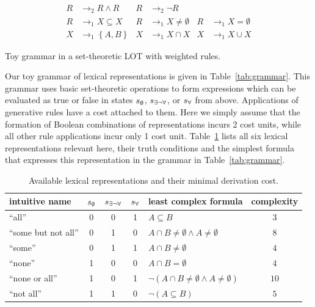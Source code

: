 \documentclass[a4paper, 11pt]{article}
\theoremstyle{Satz}
\newcommand{\set}[1]{\left\{#1\right\}}
\newcommand{\state}{\ensuremath{s}\xspace}		%
\newcommand{\mystate}[1]{\ensuremath{\state_{\text{#1}}}\xspace} %
\newcommand{\ssome}{\mystate{\ensuremath{\exists\neg\forall}}}
\newcommand{\sall}{\mystate{\ensuremath{\forall}}}
\newcommand{\snone}{\mystate{\ensuremath{\emptyset}}}
\begin{document}
\begin{table}
  \centering
  \begin{align*}
    R & \rightarrow_2 R \wedge R 
    & R & \rightarrow_2 \neg R  \\ 
    R & \rightarrow_1 X \subseteq X &
    R & \rightarrow_1 X \neq \emptyset &
    R & \rightarrow_1 X = \emptyset  \\
    X & \rightarrow_1 \set{A,B} & 
    X & \rightarrow_1 X \cap X & 
    X & \rightarrow_1 X \cup X    
  \end{align*}
  \caption{Toy grammar in a set-theoretic LOT with weighted rules.}
  \label{tab:grammar}
\end{table}

Our toy grammar of lexical representations is given in Table~\ref{tab:grammar}. This grammar uses basic
set-theoretic operations to form expressions which can be evaluated as true or false in states
$\snone$, $\ssome$, or $\sall$ from above. Applications of generative rules have a cost attached
to them. Here we simply assume that the formation of Boolean combinations of representations incurs 2
cost units, while all other rule applications incur only 1 cost unit. Table~\ref{tab:concepts}
lists all six lexical representations relevant here, their truth conditions and the simplest formula that
expresses this representation in the grammar in Table~\ref{tab:grammar}.

\begin{table}
  \centering
\begin{center}
  \begin{tabular}{lccclc}
    \toprule
    intuitive name
    & \snone
    & \ssome
    & \sall
    & least complex formula
    & complexity
    \\ \midrule
    ``all''
    & 0
    & 0
    & 1
    & $A \subseteq B$
    & $3$
    \\
    ``some but not all''
    & 0
    & 1
    & 0
    & $A \cap B \neq \emptyset \wedge A \neq \emptyset$
    & $8$
    \\    
    ``some''
    & 0
    & 1
    & 1
    & $A \cap B \neq \emptyset$
    & $4$
    \\
    ``none''
    & 1
    & 0
    & 0
    & $A \cap B = \emptyset$
    & $4$
    \\
    ``none or all''
    & 1
    & 0
    & 1
    & $\neg(A \cap B \neq \emptyset \wedge A \neq \emptyset)$
    & $10$
    \\
    ``not all''
    & 1
    & 1
    & 0
    & $\neg (A \subseteq B)$
    & $5$
    \\
    \bottomrule
  \end{tabular}
\end{center}
\caption{Available lexical representations and their minimal derivation cost.}
\label{tab:concepts}
\end{table}
\end{document}
